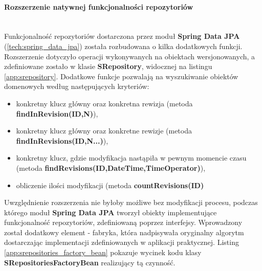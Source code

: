 	\paragraph{Rozszerzenie natywnej funkcjonalności repozytoriów} \hspace{0pt} \\
	Funkcjonalność repozytoriów dostarczona przez moduł \textbf{Spring Data JPA} (\ref{tech:spring_data_jpa}) została rozbudowana o kilka dodatkowych funkcji. Rozszerzenie dotyczyło operacji wykonywanych na obiektach wersjonowanych, a zdefiniowane zostało w klasie \textbf{SRepository}, widocznej na listingu \ref{app:srepository}. 	Dodatkowe funkcje pozwalają na wyszukiwanie obiektów domenowych według następujących kryteriów:
	\begin{itemize}
		\item konkretny klucz główny oraz konkretna rewizja (metoda \textbf{findInRevision(ID,N)}),
		\item konkretny klucz główny oraz konkretne rewizje (metoda \textbf{findInRevisions(ID,N...)}),
		\item konkretny klucz, gdzie modyfikacja nastąpiła w pewnym momencie czasu (metoda \textbf{findRevisions(ID,DateTime,TimeOperator)}),
		\item obliczenie ilości modyfikacji (metoda \textbf{countRevisions(ID)}
	\end{itemize}
	
	
	Uwzględnienie rozszerzenia nie byłoby możliwe bez modyfikacji procesu, podczas którego moduł \textbf{Spring Data JPA} tworzył obiekty implementujące funkcjonalność repozytoriów, zdefiniowaną poprzez interfejsy. Wprowadzony został dodatkowy element - fabryka, która nadpisywała oryginalny algorytm dostarczając implementacji zdefiniowanych w aplikacji praktycznej. Listing \ref{app:srepositories_factory_bean} pokazuje wycinek kodu klasy \textbf{SRepositoriesFactoryBean} realizujący tą czynność. 
	

